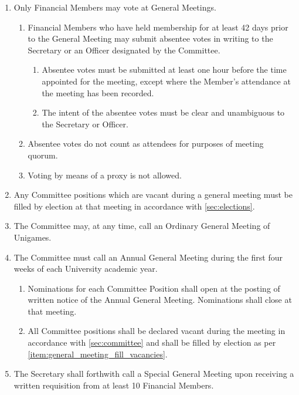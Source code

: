 \documentclass[a4paper]{article}
\begin{document}
\begin{enumerate}
    \item Only Financial Members may vote at General Meetings.
          \begin{enumerate}
              \item Financial Members who have held membership for at least 42 days prior to the General Meeting may submit absentee votes in writing to the Secretary or an Officer designated by the Committee.
                    \begin{enumerate}
                        \item Absentee votes must be submitted at least one hour before the time appointed for the meeting, except where the Member’s attendance at the meeting has been recorded.
                        \item The intent of the absentee votes must be clear and unambiguous to the Secretary or Officer.
                    \end{enumerate}
              \item Absentee votes do not count as attendees for purposes of meeting quorum.
              \item Voting by means of a proxy is not allowed.
          \end{enumerate}
    \item \label{item:general_meeting_fill_vacancies} Any Committee positions which are vacant during a general meeting must be filled by election at that meeting in accordance with \cref{sec:elections}.
    \item The Committee may, at any time, call an Ordinary General Meeting of Unigames.
    \item The Committee must call an Annual General Meeting during the first four weeks of each University academic year.
          \begin{enumerate}
              \item Nominations for each Committee Position shall open at the posting of written notice of the Annual General Meeting. Nominations shall close at that meeting.
              \item All Committee positions shall be declared vacant during the meeting in accordance with \cref{sec:committee} and shall be filled by election as per \cref{item:general_meeting_fill_vacancies}.
          \end{enumerate}
    \item The Secretary shall forthwith call a Special General Meeting upon receiving a written requisition from at least 10 Financial Members.
          \begin{enumerate}

\end{enumerate}
\end{enumerate}
\end{document}
